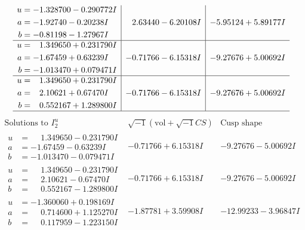\documentclass[1p]{elsarticle_modified}
\theoremstyle{definition}
\newcommand{\I}{\sqrt{-1}}
\begin{document}
$$\begin{array}{c|c|c}
\begin{aligned}
u &= -1.328700 - 0.290772 I \\
a &= -1.92740 - 0.20238 I \\
b &= -0.81198 - 1.27967 I\end{aligned}
 & \phantom{-}2.63440 - 6.20108 I & -5.95124 + 5.89177 I \\ \hline\begin{aligned}
u &= \phantom{-}1.349650 + 0.231790 I \\
a &= -1.67459 + 0.63239 I \\
b &= -1.013470 + 0.079471 I\end{aligned}
 & -0.71766 - 6.15318 I & -9.27676 + 5.00692 I \\ \hline\begin{aligned}
u &= \phantom{-}1.349650 + 0.231790 I \\
a &= \phantom{-}2.10621 + 0.67470 I \\
b &= \phantom{-}0.552167 + 1.289800 I\end{aligned}
 & -0.71766 - 6.15318 I & -9.27676 + 5.00692 I\\
 \hline 
 \end{array}$$\newpage$$\begin{array}{c|c|c}  
\text{Solutions to }I^u_{2}& \I (\text{vol} + \sqrt{-1}CS) & \text{Cusp shape}\\
 \hline 
\begin{aligned}
u &= \phantom{-}1.349650 - 0.231790 I \\
a &= -1.67459 - 0.63239 I \\
b &= -1.013470 - 0.079471 I\end{aligned}
 & -0.71766 + 6.15318 I & -9.27676 - 5.00692 I \\ \hline\begin{aligned}
u &= \phantom{-}1.349650 - 0.231790 I \\
a &= \phantom{-}2.10621 - 0.67470 I \\
b &= \phantom{-}0.552167 - 1.289800 I\end{aligned}
 & -0.71766 + 6.15318 I & -9.27676 - 5.00692 I \\ \hline\begin{aligned}
u &= -1.360060 + 0.198169 I \\
a &= \phantom{-}0.714600 + 1.125270 I \\
b &= \phantom{-}0.117959 - 1.223150 I\end{aligned}
 & -1.87781 + 3.59908 I & -12.99233 - 3.96847 I \\ \hline\begin{aligned}

\end{aligned}
\end{array}$$
\end{document}
